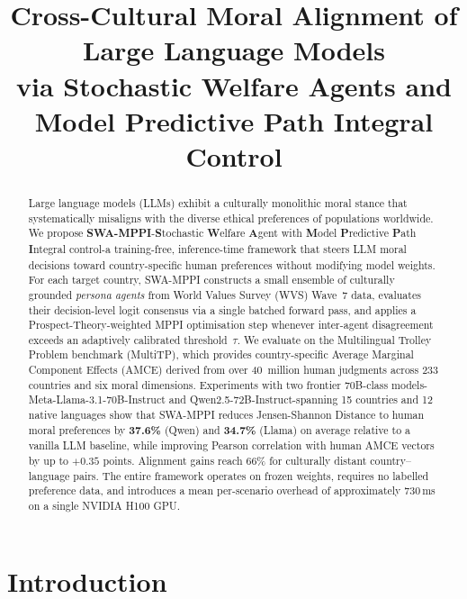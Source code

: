 \documentclass{article}
\title{Cross-Cultural Moral Alignment of Large Language Models\\
via Stochastic Welfare Agents and\\
Model Predictive Path Integral Control}
\author{}
\begin{document}
\maketitle

\begin{abstract}
Large language models (LLMs) exhibit a culturally monolithic moral stance that
systematically misaligns with the diverse ethical preferences of populations
worldwide. We propose \textbf{SWA-MPPI}-\textbf{S}tochastic \textbf{W}elfare
\textbf{A}gent with \textbf{M}odel \textbf{P}redictive \textbf{P}ath
\textbf{I}ntegral control-a training-free, inference-time framework that steers
LLM moral decisions toward country-specific human preferences without modifying
model weights. For each target country, SWA-MPPI constructs a small ensemble of
culturally grounded \emph{persona agents} from World Values Survey (WVS) Wave~7
data, evaluates their decision-level logit consensus via a single batched forward
pass, and applies a Prospect-Theory-weighted MPPI optimisation step whenever
inter-agent disagreement exceeds an adaptively calibrated threshold~$\tau$. We
evaluate on the Multilingual Trolley Problem benchmark (MultiTP), which provides
country-specific Average Marginal Component Effects (AMCE) derived from over
40~million human judgments across 233 countries and six moral dimensions. Experiments
with two frontier 70B-class models-Meta-Llama-3.1-70B-Instruct and
Qwen2.5-72B-Instruct-spanning 15 countries and 12 native languages show that
SWA-MPPI reduces Jensen-Shannon Distance to human moral preferences by
\textbf{37.6\%} (Qwen) and \textbf{34.7\%} (Llama) on average relative to a
vanilla LLM baseline, while improving Pearson correlation with human AMCE vectors
by up to $+0.35$ points. Alignment gains reach 66\% for culturally distant
country--language pairs. The entire framework operates on frozen weights, requires
no labelled preference data, and introduces a mean per-scenario overhead of
approximately 730\,ms on a single NVIDIA H100 GPU.
\end{abstract}

\section{Introduction}
\label{sec:intro}
\end{document}
